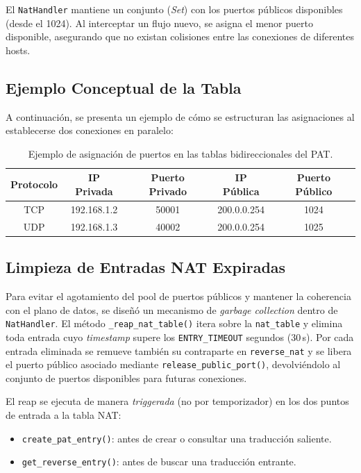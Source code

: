 \documentclass[11pt, a4paper]{article}
\begin{document}
El \texttt{NatHandler} mantiene un conjunto (\textit{Set}) con los puertos públicos disponibles (desde el 1024). Al interceptar un flujo nuevo, se asigna el menor puerto disponible, asegurando que no existan colisiones entre las conexiones de diferentes hosts.

\subsection{Ejemplo Conceptual de la Tabla}
A continuación, se presenta un ejemplo de cómo se estructuran las asignaciones al establecerse dos conexiones en paralelo:

\begin{table}[h!]
\centering
\begin{tabular}{ccccc}
\toprule
\textbf{Protocolo} & \textbf{IP Privada} & \textbf{Puerto Privado} & \textbf{IP Pública} & \textbf{Puerto Público} \\
\midrule
TCP & 192.168.1.2 & 50001 & 200.0.0.254 & 1024 \\
UDP & 192.168.1.3 & 40002 & 200.0.0.254 & 1025 \\
\bottomrule
\end{tabular}
\caption{Ejemplo de asignación de puertos en las tablas bidireccionales del PAT.}
\label{tab:ejemplo_nat}
\end{table}

\subsection{Limpieza de Entradas NAT Expiradas}
\label{subsec:gc_nat}

Para evitar el agotamiento del pool de puertos públicos y mantener la coherencia con el plano de datos, se diseñó un mecanismo de \textit{garbage collection} dentro de \texttt{NatHandler}. El método \texttt{\_reap\_nat\_table()} itera sobre la \texttt{nat\_table} y elimina toda entrada cuyo \textit{timestamp} supere los \texttt{ENTRY\_TIMEOUT} segundos (30\,s). Por cada entrada eliminada se remueve también su contraparte en \texttt{reverse\_nat} y se libera el puerto público asociado mediante \texttt{release\_public\_port()}, devolviéndolo al conjunto de puertos disponibles para futuras conexiones.

El reap se ejecuta de manera \textit{triggerada} (no por temporizador) en los dos puntos de entrada a la tabla NAT:
\begin{itemize}
    \item \texttt{create\_pat\_entry()}: antes de crear o consultar una traducción saliente.
    \item \texttt{get\_reverse\_entry()}: antes de buscar una traducción entrante.
\end{itemize}
\end{document}
